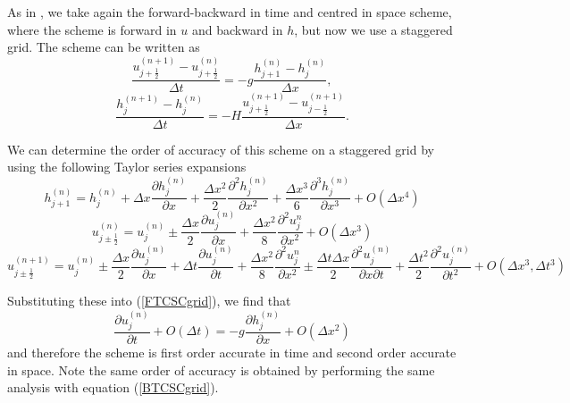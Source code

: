 \documentclass[a4paper, 10pt, notitlepage]{article}
\begin{document}
As in \cite{MPE textbook}, we take again the forward-backward in time and centred in space scheme, where the scheme is forward in $u$ and backward in $h$, but now we use a staggered grid. The scheme can be written as
\begin{equation}\label{FTCSCgrid}
\frac{u_{j+ \frac{1}{2}}^{(n+1)} - u_{j + \frac{1}{2}}^{(n)}}{\Delta t} = -g \frac{h_{j+1}^{(n)} - h_{j}^{(n)}}{\Delta x},
\end{equation}
\begin{equation}\label{BTCSCgrid}
\frac{h_{j}^{(n+1)} - h_{j}^{(n)}}{\Delta t} = -H \frac{u_{j+\frac{1}{2}}^{(n+1)} - u_{j-\frac{1}{2}}^{(n+1)}}{\Delta x}.
\end{equation}

We can determine the order of accuracy of this scheme on a staggered grid by using the following Taylor series expansions 
\begin{equation}
h_{j + 1}^{(n)} = h_{j}^{(n)} + \Delta x  \frac{\partial h_{j}^{(n)}}{\partial x} + \frac{\Delta x^{2}}{2}\frac{\partial^{2} h_{j}^{(n)}}{\partial x^{2}} + \frac{\Delta x^{3}}{6}\frac{\partial^{3} h_{j}^{(n)}}{\partial x^{3}} + O(\Delta x^{4})
\end{equation}
\begin{equation} \label{uj+1/2n}
u_{j \pm \frac{1}{2}}^{(n)} = u_{j}^{(n)} \pm \frac{\Delta x}{2}\frac{\partial u_{j}^{(n)}}{\partial x} + \frac{\Delta x^{2}}{8}\frac{\partial^{2}u_{j}^{n}}{\partial x^{2}} + O(\Delta x^{3})
\end{equation}
\begin{equation} \label{uj+1/2n+1}
u_{j \pm \frac{1}{2}}^{(n + 1)} = u_{j}^{(n)} \pm \frac{\Delta x}{2}\frac{\partial u_{j}^{(n)}}{\partial x} + \Delta t \frac{\partial u_{j}^{(n)}}{\partial t} + \frac{\Delta x^{2}}{8}\frac{\partial^{2}u_{j}^{n}}{\partial x^{2}} \pm \frac{\Delta t \Delta x}{2}\frac{\partial^{2} u_{j}^{(n)}}{\partial x \partial t} + \frac{\Delta t^{2}}{2} \frac{\partial ^{2} u_{j}^{(n)}}{\partial t ^{2}} + O(\Delta x^{3}, \Delta t^{3})
\end{equation}

Substituting these into (\ref{FTCSCgrid}), we find that 
\begin{equation}
\frac{\partial u_{j}^{(n)}}{\partial t} + O(\Delta t) =  -g \frac{\partial h_{j}^{(n)}}{\partial x} + O(\Delta x^{2})
\end{equation} 
and therefore the scheme is first order accurate in time and second order accurate in space. Note the same order of accuracy is obtained by performing the same analysis with equation (\ref{BTCSCgrid}).
\end{document}
